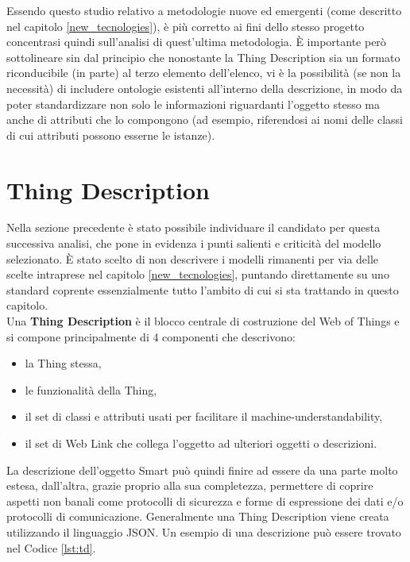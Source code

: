 \documentclass[12pt,a4paper,openright,oneside]{report}
\begin{document}
Essendo questo studio relativo a metodologie nuove ed emergenti (come descritto nel capitolo \ref{new_tecnologies}), è più corretto ai fini dello stesso progetto concentrasi quindi sull'analisi di quest'ultima metodologia. È importante però sottolineare sin dal principio che nonostante la Thing Description sia un formato riconducibile (in parte) al terzo elemento dell'elenco, vi è la possibilità (se non la necessità) di includere ontologie esistenti all'interno della descrizione, in modo da poter standardizzare non solo le informazioni riguardanti l'oggetto stesso ma anche di attributi che lo compongono (ad esempio, riferendosi ai nomi delle classi di cui attributi possono esserne le istanze).\\

\section{Thing Description}
\label{sec:thing_description}
Nella sezione precedente è stato possibile individuare il candidato per questa successiva analisi, che pone in evidenza i punti salienti e criticità del modello selezionato. È stato scelto di non descrivere i modelli rimanenti per via delle scelte intraprese nel capitolo \ref{new_tecnologies}, puntando direttamente su uno standard coprente essenzialmente tutto l'ambito di cui si sta trattando in questo capitolo.\\

Una \textbf{Thing Description} \cite{td} è il blocco centrale di costruzione del Web of Things e si compone principalmente di 4 componenti che descrivono: 
\begin{itemize}
	\setlength\itemsep{-0.7em}
	\item la Thing stessa,
	\item le funzionalità della Thing,
	\item il set di classi e attributi usati per facilitare il machine-understandability,
	\item il set di Web Link che collega l'oggetto ad ulteriori oggetti o descrizioni.
\end{itemize}

La descrizione dell'oggetto Smart può quindi finire ad essere da una parte molto estesa, dall'altra, grazie proprio alla sua completezza, permettere di coprire aspetti non banali come protocolli di sicurezza e forme di espressione dei dati e/o protocolli di comunicazione.
Generalmente una Thing Description viene creata utilizzando il linguaggio JSON. Un esempio di una descrizione può essere trovato nel Codice \ref{lst:td}.
\end{document}

